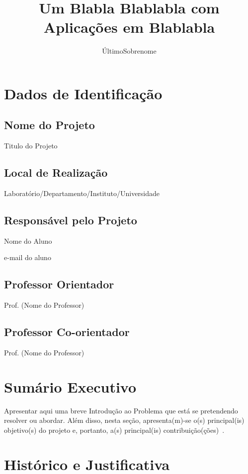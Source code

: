 \documentclass[tcc-proposta]{texifsap}
\title{Um Blabla Blablabla com Aplicações em Blablabla}
\author{ÚltimoSobrenome}{Primeiro nome e sobrenome}
\begin{document}

\maketitle 
\sloppy

\chapter{Dados de Identificação}

\section{Nome do Projeto}
Titulo do Projeto

\section{Local de Realização}
Laboratório/Departamento/Instituto/Universidade

\section{Responsável pelo Projeto}
Nome do Aluno

e-mail do aluno

\section{Professor Orientador}
Prof. (Nome do Professor)

\section{Professor Co-orientador}
Prof. (Nome do Professor)

\chapter{Sumário Executivo}

Apresentar aqui uma breve Introdução ao Problema que está se
pretendendo resolver ou abordar. Além disso, nesta seção,
apresenta(m)-se o(s) principal(is) objetivo(s) do projeto e, portanto,
a(s) principal(is) contribuição(ções)~\citet{Moore:1979:MAI,Aguiar:2005}.

\chapter{Histórico e Justificativa}
\end{document}
